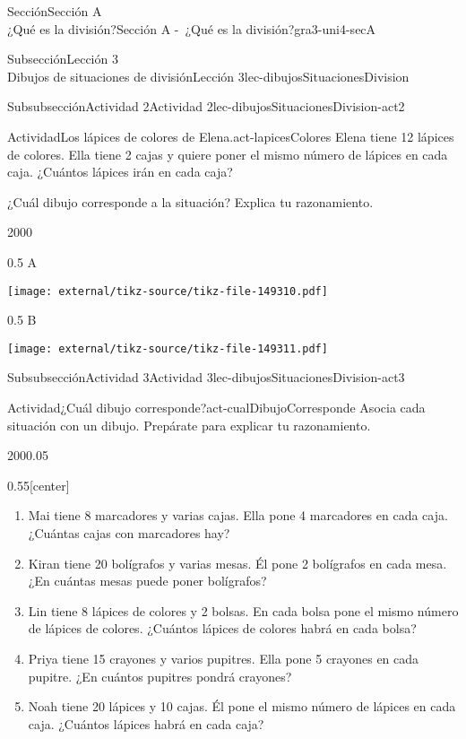 \begin{sectionptx}{Sección}{{\Large Sección A\\}¿Qué es la división?}{}{Sección A -~¿Qué es la división?}{}{}{gra3-uni4-secA}
\begin{subsectionptx}{Subsección}{{\normalsize Lección 3\\[-0.05cm]}Dibujos de situaciones de división}{}{Lección 3}{}{}{lec-dibujosSituacionesDivision}
\begin{subsubsectionptx}{Subsubsección}{Actividad 2}{}{Actividad 2}{}{}{lec-dibujosSituacionesDivision-act2}
\begin{activity}{Actividad}{Los lápices de colores de Elena.}{act-lapicesColores}
Elena tiene 12 lápices de colores. Ella tiene 2 cajas y quiere poner el mismo número de lápices en cada caja. ¿Cuántos lápices irán en cada caja?%
\par
¿Cuál dibujo corresponde a la situación? Explica tu razonamiento.%
\begin{sidebyside}{2}{0}{0}{0}%
\begin{sbspanel}{0.5}%
A%
\par
\texttt{[image: external/tikz-source/tikz-file-149310.pdf]}
\end{sbspanel}%
\begin{sbspanel}{0.5}%
B%
\par
\texttt{[image: external/tikz-source/tikz-file-149311.pdf]}
\end{sbspanel}%
\end{sidebyside}%
\end{activity}%
\end{subsubsectionptx}
%
%
\typeout{************************************************}
\typeout{************************************************}
%
\begin{subsubsectionptx}{Subsubsección}{Actividad 3}{}{Actividad 3}{}{}{lec-dibujosSituacionesDivision-act3}
\begin{activity}{Actividad}{¿Cuál dibujo corresponde?}{act-cualDibujoCorresponde}%
Asocia cada situación con un dibujo. Prepárate para explicar tu razonamiento.%
\begin{sidebyside}{2}{0}{0}{0.05}%
\begin{sbspanel}{0.55}[center]%
%
\begin{enumerate}
\item{}Mai tiene 8 marcadores y varias cajas. Ella pone 4 marcadores en cada caja. ¿Cuántas cajas con marcadores hay?%
\item{}Kiran tiene 20 bolígrafos y varias mesas. Él pone 2 bolígrafos en cada mesa. ¿En cuántas mesas puede poner bolígrafos?%
\item{}Lin tiene 8 lápices de colores y 2 bolsas. En cada bolsa pone el mismo número de lápices de colores. ¿Cuántos lápices de colores habrá en cada bolsa?%
\item{}Priya tiene 15 crayones y varios pupitres. Ella pone 5 crayones en cada pupitre. ¿En cuántos pupitres pondrá crayones?%
\item{}Noah tiene 20 lápices y 10 cajas. Él pone el mismo número de lápices en cada caja. ¿Cuántos lápices habrá en cada caja?%

\end{enumerate}
\end{sbspanel}
\end{sidebyside}
\end{activity}
\end{subsubsectionptx}
\end{subsectionptx}
\end{sectionptx}
